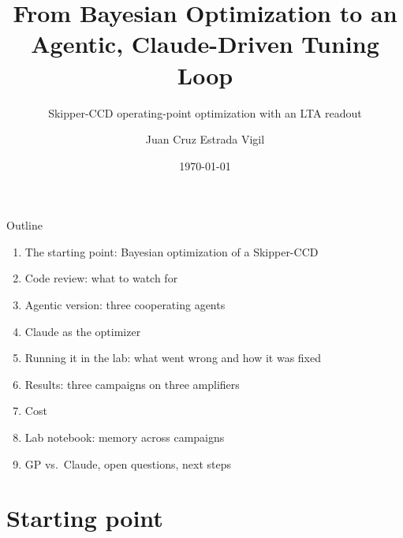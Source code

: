 \documentclass[aspectratio=169,10pt]{beamer}
\title{From Bayesian Optimization to an Agentic, Claude-Driven Tuning Loop}
\subtitle{Skipper-CCD operating-point optimization with an LTA readout}
\author{Juan Cruz Estrada Vigil}
\institute{}   %
\date{\today}
\begin{document}
\begin{frame}
  \titlepage
\end{frame}

\begin{frame}{Outline}
  \begin{enumerate}
    \item The starting point: Bayesian optimization of a Skipper-CCD
    \item Code review: what to watch for
    \item Agentic version: three cooperating agents
    \item Claude as the optimizer
    \item Running it in the lab: what went wrong and how it was fixed
    \item Results: three campaigns on three amplifiers
    \item Cost
    \item Lab notebook: memory across campaigns
    \item GP vs.\ Claude, open questions, next steps
  \end{enumerate}
\end{frame}

\section{Starting point}
\end{document}
